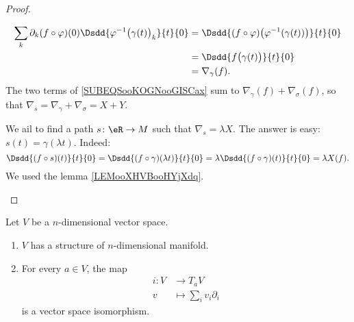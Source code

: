 \begin{proof}
\begin{subproof}
\begin{subequations}
			\begin{align}
				\sum_k\partial_k(f\circ \varphi)(0)\Dsdd{ \varphi^{-1}\big( \gamma(t) \big)_k }{t}{0} & =\Dsdd{ (f\circ\varphi)\big( \varphi^{-1}(\gamma(t)) \big) }{t}{0} \\
				                                                                                      & =\Dsdd{ f\big( \gamma(t) \big) }{t}{0}                             \\
				                                                                                      & =\nabla_{\gamma}(f).
			\end{align}
		\end{subequations}
		The two terms of \eqref{SUBEQSooKOGNooGISCax} sum to \( \nabla_{\gamma}(f)+\nabla_{\sigma}(f)\), so that \( \nabla_s=\nabla_{\gamma}+\nabla_{\sigma}=X+Y\).

		\spitem[Product]

		We ail to find a path \( s\colon \eR\to M\) such that \( \nabla_s=\lambda X\). The answer is easy: \( s(t)=\gamma(\lambda t)\). Indeed:
		\begin{equation}
			\Dsdd{ (f\circ s)(t) }{t}{0}=\Dsdd{ (f\circ \gamma)(\lambda t) }{t}{0}=\lambda \Dsdd{ (f\circ \gamma)(t) }{t}{0}=\lambda X(f).
		\end{equation}
		We used the lemma \ref{LEMooXHVBooHYjXdq}.
	\end{subproof}
\end{proof}

\begin{proposition}     \label{PROPooJVSQooGvNqIx}
	Let \( V\) be a \( n\)-dimensional vector space.
	\begin{enumerate}
		\item
		      \( V\) has a structure of \( n\)-dimensional manifold.
		\item
		      For every \( a\in V\), the map
		      \begin{equation}
			      \begin{aligned}
				      i\colon V & \to T_aV                    \\
				      v         & \mapsto \sum_iv_i\partial_i
			      \end{aligned}
		      \end{equation}
		      is a vector space isomorphism.
	\end{enumerate}
\end{proposition}

